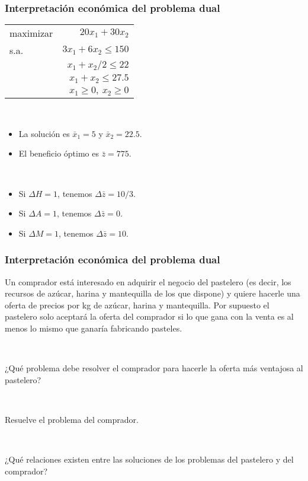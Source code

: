 \documentclass{beamer}
\begin{document}
\begin{frame}
\frametitle{Interpretación económica del problema dual}

\begin{center}
\begin{tabular}{lr}
maximizar & $20x_1 + 30x_2$ \\
s.a. & $3x_1+6x_2 \leq 150$    \\
	 & $x_1 + x_2/2 \leq 22$  \\
	 & $x_1+x_2\leq 27.5$\\
	 & $x_1\geq 0,\ x_2\geq 0$
\end{tabular}
\end{center}

\

\begin{itemize}
\item La solución es $\bar{x}_1=5$ y $\bar{x}_2=22.5$.
\item El beneficio óptimo es $\bar{z}=775$.
\end{itemize}


\

\begin{itemize}
\item Si $\Delta H=1$, tenemos $\Delta \bar{z}=10/3$.
\item Si $\Delta A=1$, tenemos $\Delta \bar{z}= 0$.
\item Si $\Delta M=1$, tenemos $\Delta \bar{z}= 10$.
\end{itemize}

\end{frame}
\begin{frame}
\frametitle{Interpretación económica del problema dual}

Un comprador está interesado en adquirir el negocio del pastelero (es decir, los recursos de azúcar, harina y mantequilla de los que dispone) y quiere hacerle una oferta de precios por kg de azúcar, harina y mantequilla. Por supuesto el pastelero solo aceptará la oferta del comprador si lo que gana con la venta es al menos lo mismo que ganaría fabricando pasteles. 

\

¿Qué problema debe resolver el comprador para hacerle la oferta más ventajosa al pastelero?

\

Resuelve el problema del comprador. 

\

¿Qué relaciones existen entre las soluciones de los problemas del pastelero y del comprador? 





\end{frame}
\end{document}
